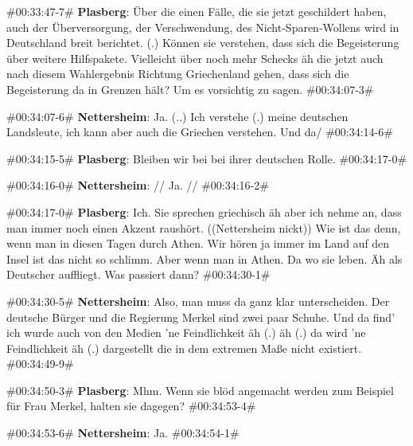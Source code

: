 \begin{description}
	\begin{linenumbers}[1]
		\item \#00:33:47-7\# \textbf{Plasberg}: Über die einen Fälle, die sie jetzt geschildert haben, auch der Überversorgung, der Verschwendung, des Nicht-Sparen-Wollens wird in Deutschland breit berichtet. (.) Können sie verstehen, dass sich die Begeisterung über weitere Hilfspakete. Vielleicht über noch mehr Schecks äh die jetzt auch nach diesem Wahlergebnis Richtung Griechenland gehen, dass sich die Begeisterung da in Grenzen hält? Um es vorsichtig zu sagen. \#00:34:07-3\#
		
		\item \#00:34:07-6\# \textbf{Nettersheim}: Ja. (..) Ich verstehe (.) meine deutschen Landsleute, ich kann aber auch die Griechen verstehen. Und da/  \#00:34:14-6\#
		
		\item \#00:34:15-5\#  \textbf{Plasberg}: Bleiben wir bei bei ihrer deutschen Rolle. \#00:34:17-0\#
		
		\item \#00:34:16-0\# \textbf{Nettersheim}: // Ja. //  \#00:34:16-2\#
		
		\item \#00:34:17-0\# \textbf{Plasberg}: Ich. Sie sprechen griechisch äh aber ich nehme an, dass man immer noch einen Akzent raushört. ((Nettersheim nickt)) Wie ist das denn, wenn man in diesen Tagen durch Athen. Wir hören ja immer im Land auf den Insel ist das nicht so schlimm. Aber wenn man in Athen. Da wo sie leben. Äh als Deutscher auffliegt. Was passiert dann? \#00:34:30-1\#
		
		\item \#00:34:30-5\# \textbf{Nettersheim}: Also, man muss da ganz klar unterscheiden. Der deutsche Bürger und die Regierung Merkel sind zwei paar Schuhe. Und da find' ich wurde auch von den Medien 'ne Feindlichkeit äh (.) äh (.) da wird 'ne Feindlichkeit äh (.) dargestellt die in dem extremen Maße nicht existiert. \#00:34:49-9\#
		
		\item \#00:34:50-3\# \textbf{Plasberg}: Mhm. Wenn sie blöd angemacht werden zum Beispiel für Frau Merkel, halten sie dagegen? \#00:34:53-4\#
		
		\item \#00:34:53-6\# \textbf{Nettersheim}: Ja. \#00:34:54-1\#
	\end{linenumbers}
	\label{lis:17}
\end{description}

